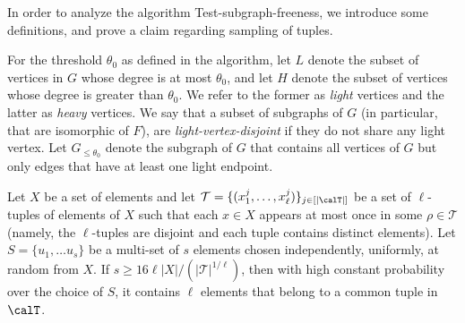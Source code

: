 \medskip
In order to analyze the algorithm Test-subgraph-freeness, we introduce some definitions, and 
prove a claim regarding sampling of tuples.

For the threshold $\theta_0$ as defined in the algorithm, let $L$ denote the subset of vertices in $G$ whose degree is at most $\theta_0$, and let $H$ denote the subset of vertices whose degree is greater than $\theta_0$. 
We refer to the former as \emph{light} vertices and the latter as \emph{heavy} vertices. 
We say that a subset of subgraphs of $G$ (in particular, that are isomorphic of $F$), are 
{\em light-vertex-disjoint} if they do not share any light vertex.
Let $G_{\leq \theta_0}$ denote the subgraph of $G$ that contains all vertices of $G$ but only edges that have at least one light endpoint.


\begin{claim}\label{clm:ver-num}
Let $X$ be a set of elements %
and let $\mathcal{T}=\{(x^j_1, \ldots, x^j_\ell)\}_{j\in [|\calT|]}$ be a set of $\ell$-tuples of elements of $X$ such that each $x\in X$ appears at most once in some $\rho\in \mathcal{T}$ (namely, the $\ell$-tuples are disjoint and each tuple contains distinct elements).
Let $S = \{u_1, \ldots u_s\}$ be a multi-set of $s$ elements chosen independently, uniformly, at random from $X$. %
If $s \geq 16 \ell |X| / (|\mathcal{T}|^{1/\ell})$, then with high constant probability over the choice of $S$, it contains $\ell$ elements that belong to a common tuple in $\calT$.
\end{claim}

